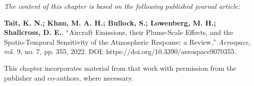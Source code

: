 \textit{The content of this chapter is based on the following published journal article:}

\textbf{Tait, K. N.; Khan, M. A. H.; Bullock, S.; Lowenberg, M. H.; Shallcross, D. E.}, ``Aircraft Emissions, their Plume-Scale Effects, and the Spatio-Temporal Sensitivity of the Atmospheric Response: a Review,'' \textit{Aerospace}, vol. 9, no. 7, pp. 355, 2022. DOI: https://doi.org/10.3390/aerospace9070355.

This chapter incorporates material from that work with permission from the publisher and co-authors, where necessary. %















